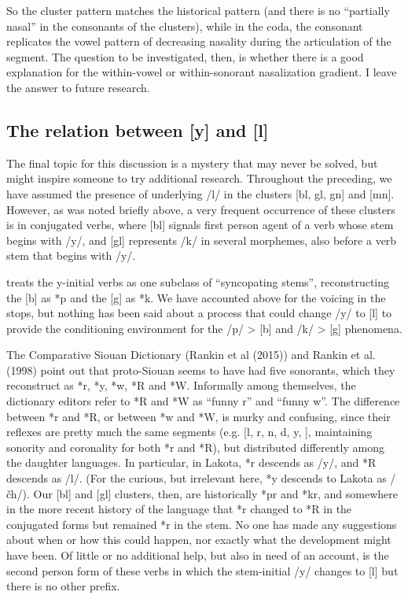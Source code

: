 \documentclass[output=paper]{LSP/langsci}
\begin{document}
So the cluster pattern matches the historical pattern (and there is no ``partially nasal'' in the consonants of the clusters), while in the coda, the consonant replicates the vowel pattern of decreasing nasality during the articulation of the segment. The question to be investigated, then, is whether there is a good explanation for the within-vowel or within-sonorant nasalization gradient. I leave the answer to future research.

\subsection{The relation between [y] and [l]}

The final topic for this discussion is a mystery that may never be solved, but might inspire someone to try additional research. Throughout the preceding, we have assumed the presence of underlying /l/ in the clusters [bl, gl, gn] and [mn]. However, as was noted briefly above, a very frequent occurrence of these clusters is in conjugated verbs, where [bl] signals first person agent of a verb whose stem begins with /y/, and [gl] represents /k/ in several morphemes, also before a verb stem that begins with /y/.

\citet{Koontz1991} treats the y-initial verbs as one subclass of ``syncopating stems'', reconstructing the [b] as *p and the [g] as *k. We have accounted above for the voicing in the stops, but nothing has been said about a process that could change /y/ to [l] to provide the conditioning environment for the /p/ > [b] and /k/ > [g] phenomena.

The Comparative Siouan Dictionary (Rankin et al  (2015)) and Rankin et al. (1998) point out that proto-Siouan seems to have had five sonorants, which they reconstruct as *r, *y, *w, *R and *W. Informally among themselves, the dictionary editors refer to *R and *W as ``funny r'' and ``funny w''. The difference between *r and *R, or between *w and *W, is murky and confusing, since their reflexes are pretty much the same segments (e.g. [l, r, n, d, y, ], maintaining sonority and coronality for both *r and *R), but distributed differently among the daughter languages. In particular, in Lakota, *r descends as /y/, and *R descends as /l/. (For the curious, but irrelevant here, *y descends to Lakota as /\v{c}h/). Our [bl] and [gl] clusters, then, are historically *pr and *kr, and somewhere in the more recent history of the language that *r changed to *R in the conjugated forms but remained *r in the stem. No one has made any suggestions about when or how this could happen, nor exactly what the development might have been. Of little or no additional help, but also in need of an account, is the second person form of these verbs in which the stem-initial /y/ changes to [l] but there is no other prefix.
\end{document}
